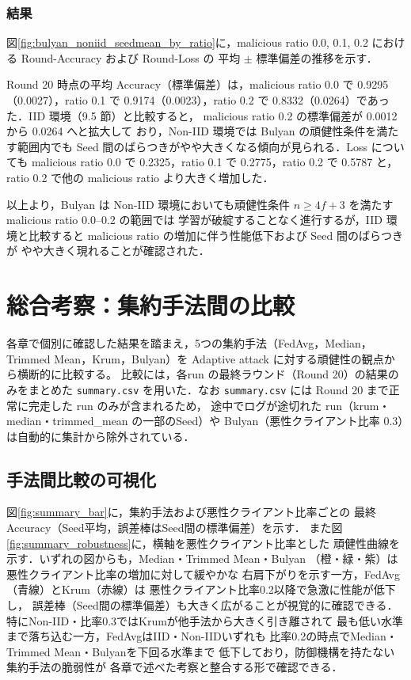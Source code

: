 \documentclass[a4j,twocolumn,dvipdfmx]{jsarticle}
\begin{document}
\subsubsection{結果}

図\ref{fig:bulyan_noniid_seedmean_by_ratio}に，malicious ratio
0.0, 0.1, 0.2 における Round-Accuracy および Round-Loss の
平均 $\pm$ 標準偏差の推移を示す．

Round 20 時点の平均 Accuracy（標準偏差）は，malicious ratio 0.0 で
0.9295（0.0027），ratio 0.1 で 0.9174（0.0023），ratio 0.2 で
0.8332（0.0264）であった．IID 環境（9.5 節）と比較すると，
malicious ratio 0.2 の標準偏差が 0.0012 から 0.0264 へと拡大して
おり，Non-IID 環境では Bulyan の頑健性条件を満たす範囲内でも
Seed 間のばらつきがやや大きくなる傾向が見られる．Loss についても
malicious ratio 0.0 で 0.2325，ratio 0.1 で 0.2775，ratio 0.2 で
0.5787 と，ratio 0.2 で他の malicious ratio より大きく増加した．

以上より，Bulyan は Non-IID 環境においても頑健性条件
$n \geq 4f+3$ を満たす malicious ratio 0.0--0.2 の範囲では
学習が破綻することなく進行するが，IID 環境と比較すると
malicious ratio の増加に伴う性能低下および Seed 間のばらつきが
やや大きく現れることが確認された．

\clearpage
\section{総合考察：集約手法間の比較}

各章で個別に確認した結果を踏まえ，5つの集約手法（FedAvg，Median，Trimmed Mean，Krum，Bulyan）を
Adaptive attack に対する頑健性の観点から横断的に比較する。
比較には，各run の最終ラウンド（Round 20）の結果のみをまとめた
\texttt{summary.csv} を用いた．なお \texttt{summary.csv} には
Round 20 まで正常に完走した run のみが含まれるため，
途中でログが途切れた run（krum・median・trimmed\_mean の一部のSeed）や
Bulyan（悪性クライアント比率 0.3）は自動的に集計から除外されている．

\subsection{手法間比較の可視化}

図\ref{fig:summary_bar}に，集約手法および悪性クライアント比率ごとの
最終Accuracy（Seed平均，誤差棒はSeed間の標準偏差）を示す．
また図\ref{fig:summary_robustness}に，横軸を悪性クライアント比率とした
頑健性曲線を示す．いずれの図からも，Median・Trimmed Mean・Bulyan
（橙・緑・紫）は悪性クライアント比率の増加に対して緩やかな
右肩下がりを示す一方，FedAvg（青線）とKrum（赤線）は
悪性クライアント比率0.2以降で急激に性能が低下し，
誤差棒（Seed間の標準偏差）も大きく広がることが視覚的に確認できる．
特にNon-IID・比率0.3ではKrumが他手法から大きく引き離されて
最も低い水準まで落ち込む一方，FedAvgはIID・Non-IIDいずれも
比率0.2の時点でMedian・Trimmed Mean・Bulyanを下回る水準まで
低下しており，防御機構を持たない集約手法の脆弱性が
各章で述べた考察と整合する形で確認できる．
\end{document}
